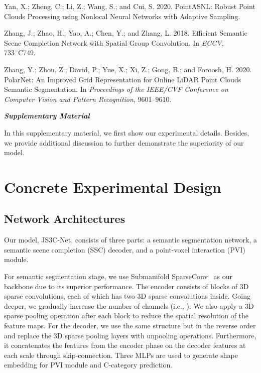 \documentclass[letterpaper]{article} \usepackage{aaai21}  \usepackage{times}  \usepackage{helvet} \usepackage{courier}  \usepackage[hyphens]{url}  \usepackage{graphicx} \urlstyle{rm} \def\UrlFont{\rm}  \usepackage{natbib}  \usepackage{booktabs}
\begin{document}
\begin{thebibliography}{48}
Yan, X.; Zheng, C.; Li, Z.; Wang, S.; and Cui, S. 2020.
\newblock PointASNL: Robust Point Clouds Processing using Nonlocal Neural
  Networks with Adaptive Sampling.

Zhang, J.; Zhao, H.; Yao, A.; Chen, Y.; and Zhang, L. 2018.
\newblock Efficient Semantic Scene Completion Network with Spatial Group
  Convolution.
\newblock In \emph{ECCV}, 733¨C749.

Zhang, Y.; Zhou, Z.; David, P.; Yue, X.; Xi, Z.; Gong, B.; and Foroosh, H.
  2020.
\newblock PolarNet: An Improved Grid Representation for Online LiDAR Point
  Clouds Semantic Segmentation.
\newblock In \emph{Proceedings of the IEEE/CVF Conference on Computer Vision
  and Pattern Recognition}, 9601--9610.

\end{thebibliography}
 \newpage
	

    
	\begin{center}
		{\textit{\LARGE\bf Supplementary Material}}
	\end{center}

	
	\thispagestyle{empty}
	\setcounter{section}{0}
	\setcounter{figure}{0}
	\setcounter{table}{0}
	\renewcommand\thesection{\Alph{section}}
	
    
	In this supplementary material, we first show our experimental details. 
Besides, we provide additional discussion to further demonstrate the superiority of our model.
	
	\section{Concrete Experimental Design}
	\label{concrete}
	\subsection{Network Architectures}
	
	Our model, JS3C-Net, consists of three parts: a semantic segmentation network, a semantic scene completion (SSC) decoder, and a point-voxel interaction (PVI) module. 
	
    For semantic segmentation stage, we use Submanifold SparseConv~\cite{SparseConv} as our backbone due to its superior performance. 
The encoder consists of  blocks of 3D sparse convolutions, each of which has two 3D sparse convolutions inside. Going deeper, we gradually increase the number of channels (i.e., ). 
We also apply a 3D sparse pooling operation after each block to reduce the spatial resolution of the feature maps. 
For the decoder, we use the same structure but in the reverse order and replace the 3D sparse pooling layers with unpooling operations.
Furthermore, it concatenates the features from the encoder phase on the decoder features at each scale through skip-connection. 
Three MLPs are used to generate shape embedding for PVI module and C-category prediction.
\end{document}
